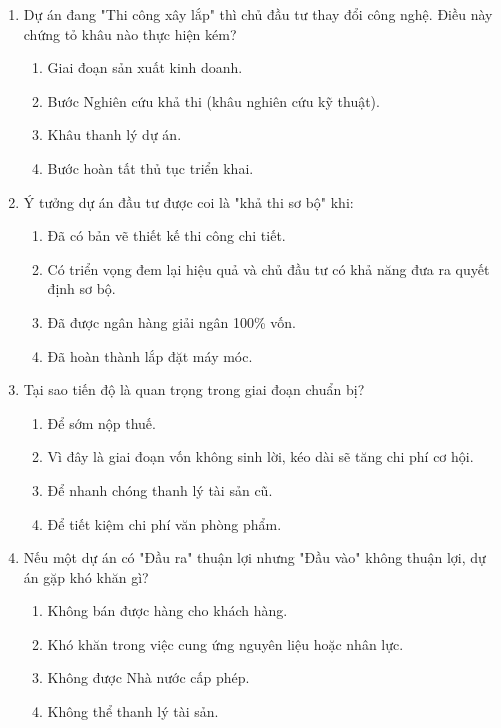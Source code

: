\begin{enumerate}[label=\textbf{Câu \arabic*:}, leftmargin=*]
\item Dự án đang "Thi công xây lắp" thì chủ đầu tư thay đổi công nghệ. Điều này chứng tỏ khâu nào thực hiện kém?
\begin{enumerate}[label=\Alph*.]
    \item Giai đoạn sản xuất kinh doanh.
    \item Bước Nghiên cứu khả thi (khâu nghiên cứu kỹ thuật).
    \item Khâu thanh lý dự án.
    \item Bước hoàn tất thủ tục triển khai.
\end{enumerate}

\item Ý tưởng dự án đầu tư được coi là "khả thi sơ bộ" khi:
\begin{enumerate}[label=\Alph*.]
    \item Đã có bản vẽ thiết kế thi công chi tiết.
    \item Có triển vọng đem lại hiệu quả và chủ đầu tư có khả năng đưa ra quyết định sơ bộ.
    \item Đã được ngân hàng giải ngân 100\% vốn.
    \item Đã hoàn thành lắp đặt máy móc.
\end{enumerate}

\item Tại sao tiến độ là quan trọng trong giai đoạn chuẩn bị?
\begin{enumerate}[label=\Alph*.]
    \item Để sớm nộp thuế.
    \item Vì đây là giai đoạn vốn không sinh lời, kéo dài sẽ tăng chi phí cơ hội.
    \item Để nhanh chóng thanh lý tài sản cũ.
    \item Để tiết kiệm chi phí văn phòng phẩm.
\end{enumerate}

\item Nếu một dự án có "Đầu ra" thuận lợi nhưng "Đầu vào" không thuận lợi, dự án gặp khó khăn gì?
\begin{enumerate}[label=\Alph*.]
    \item Không bán được hàng cho khách hàng.
    \item Khó khăn trong việc cung ứng nguyên liệu hoặc nhân lực.
    \item Không được Nhà nước cấp phép.
    \item Không thể thanh lý tài sản.
\end{enumerate}


\end{enumerate}
